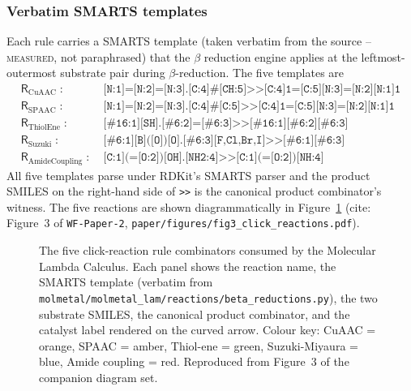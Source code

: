 \subsubsection{Verbatim SMARTS templates}
\label{sec:click-chem-smarts}

Each rule carries a SMARTS template (taken verbatim from the
source -- \textsc{measured}, not paraphrased) that the
$\beta$ reduction engine applies at the leftmost-outermost
substrate pair during $\beta$-reduction. The five templates are
\begin{align}
  \mathsf{R}_{\text{CuAAC}}\;:\;&
    \texttt{[N:1]=[N:2]=[N:3].[C:4]\#[CH:5]>>[C:4]1=[C:5][N:3]=[N:2][N:1]1}
  \tag{CuAAC}
  \label{eq:smarts-cuaac}\\
  \mathsf{R}_{\text{SPAAC}}\;:\;&
    \texttt{[N:1]=[N:2]=[N:3].[C:4]\#[C:5]>>[C:4]1=[C:5][N:3]=[N:2][N:1]1}
  \tag{SPAAC}
  \label{eq:smarts-spaac}\\
  \mathsf{R}_{\text{ThiolEne}}\;:\;&
    \texttt{[\#16:1][SH].[\#6:2]=[\#6:3]>>[\#16:1][\#6:2][\#6:3]}
  \tag{ThiolEne}
  \label{eq:smarts-thiolene}\\
  \mathsf{R}_{\text{Suzuki}}\;:\;&
    \texttt{[\#6:1][B]([O])[O].[\#6:3][F,Cl,Br,I]>>[\#6:1][\#6:3]}
  \tag{Suzuki}
  \label{eq:smarts-suzuki}\\
  \mathsf{R}_{\text{AmideCoupling}}\;:\;&
    \texttt{[C:1](=[O:2])[OH].[NH2:4]>>[C:1](=[O:2])[NH:4]}
  \tag{AmideCoupling}
  \label{eq:smarts-amide}
\end{align}
All five templates parse under RDKit's SMARTS parser and the
product SMILES on the right-hand side of \texttt{>>} is the
canonical product combinator's witness. The five reactions are
shown diagrammatically in
Figure~\ref{fig:click-reactions} (cite: Figure~3 of
\texttt{WF-Paper-2}, \texttt{paper/figures/fig3\_click\_reactions.pdf}).

\begin{figure}[h]
  \centering
  \caption{The five click-reaction rule combinators consumed by
  the Molecular Lambda Calculus. Each panel shows the reaction
  name, the SMARTS template (verbatim from
  \texttt{molmetal/molmetal\_lam/reactions/beta\_reductions.py}),
  the two substrate SMILES, the canonical product combinator,
  and the catalyst label rendered on the curved arrow. Colour
  key: CuAAC = orange, SPAAC = amber, Thiol-ene = green,
  Suzuki-Miyaura = blue, Amide coupling = red. Reproduced from
  Figure~3 of the companion diagram set.}
  \label{fig:click-reactions}
\end{figure}

